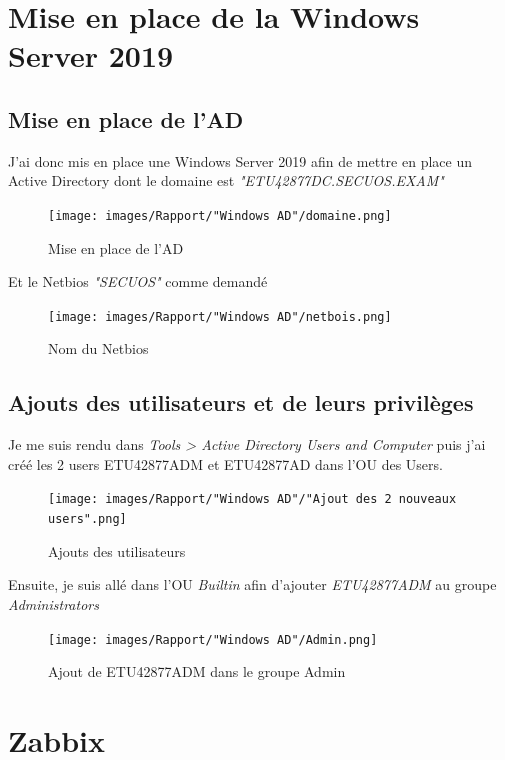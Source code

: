 \documentclass[a4paper]{article}
\begin{document}
\let\cleardoublepage\clearpage

\tableofcontents
\newpage

\section{Mise en place de la Windows Server 2019}
\subsection{Mise en place de l'AD}
J'ai donc mis en place une Windows Server 2019 afin de mettre en place un Active Directory dont le domaine est \emph{"ETU42877DC.SECUOS.EXAM"}
\begin{figure}[H]
  \centering
  \texttt{[image: images/Rapport/"Windows AD"/domaine.png]}
  \caption{Mise en place de l'AD}
\end{figure}
Et le Netbios \emph{"SECUOS"} comme demandé
\begin{figure}[H]
  \centering
  \texttt{[image: images/Rapport/"Windows AD"/netbois.png]}
  \caption{Nom du Netbios}
\end{figure}
\subsection{Ajouts des utilisateurs et de leurs privilèges}
Je me suis rendu dans \emph{Tools > Active Directory Users and Computer} puis j'ai créé les 2 users ETU42877ADM et ETU42877AD dans l'OU des Users.
\begin{figure}[H]
  \centering
  \texttt{[image: images/Rapport/"Windows AD"/"Ajout des 2 nouveaux users".png]}
  \caption{Ajouts des utilisateurs}
\end{figure}
Ensuite, je suis allé dans l'OU \emph{Builtin} afin d'ajouter \emph{ETU42877ADM} au groupe \emph{Administrators}
\begin{figure}[H]
  \centering
  \texttt{[image: images/Rapport/"Windows AD"/Admin.png]}
  \caption{Ajout de ETU42877ADM dans le groupe Admin}
\end{figure}



\newpage
\section{Zabbix}
\end{document}
